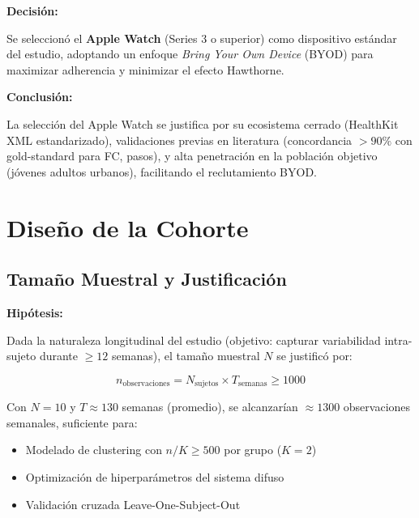 \documentclass[12pt,letterpaper,twoside]{report}
\begin{document}
\begin{decisionbox}
\textbf{Decisión:}

Se seleccionó el \textbf{Apple Watch} (Series 3 o superior) como dispositivo estándar del estudio, adoptando un enfoque \textit{Bring Your Own Device} (BYOD) para maximizar adherencia y minimizar el efecto Hawthorne.
\end{decisionbox}

\begin{conclusionbox}
\textbf{Conclusión:}

La selección del Apple Watch se justifica por su ecosistema cerrado (HealthKit XML estandarizado), validaciones previas en literatura (concordancia $> 90\%$ con gold-standard para FC, pasos), y alta penetración en la población objetivo (jóvenes adultos urbanos), facilitando el reclutamiento BYOD.
\end{conclusionbox}

\section{Diseño de la Cohorte}

\subsection{Tamaño Muestral y Justificación}

\begin{hipotesisbox}
\textbf{Hipótesis:}

Dada la naturaleza longitudinal del estudio (objetivo: capturar variabilidad intra-sujeto durante $\geq 12$ semanas), el tamaño muestral $N$ se justificó por:

\begin{equation}
n_{\text{observaciones}} = N_{\text{sujetos}} \times T_{\text{semanas}} \geq 1000
\end{equation}

Con $N=10$ y $T \approx 130$ semanas (promedio), se alcanzarían $\approx 1300$ observaciones semanales, suficiente para:
\begin{itemize}[noitemsep]
    \item Modelado de clustering con $n/K \geq 500$ por grupo ($K=2$)
    \item Optimización de hiperparámetros del sistema difuso
    \item Validación cruzada Leave-One-Subject-Out
\end{itemize}
\end{hipotesisbox}
\end{document}
